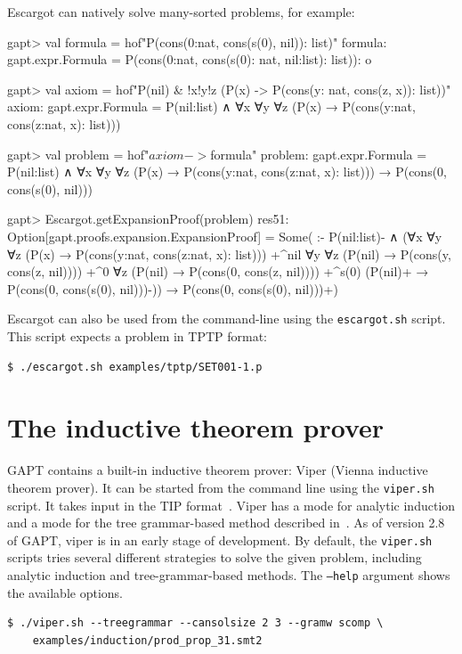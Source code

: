 \documentclass[a4paper,11pt]{book}
\newcommand{\cli}[1]{{\ttfamily {#1}}}
\begin{document}
Escargot can natively solve many-sorted problems, for example:
\begin{clilisting}
gapt> val formula = hof"P(cons(0:nat, cons(s(0), nil)): list)"
formula: gapt.expr.Formula = P(cons(0:nat, cons(s(0): nat, nil:list): list)): o

gapt> val axiom = hof"P(nil) & !x!y!z (P(x) -> P(cons(y: nat, cons(z, x)): list))"
axiom: gapt.expr.Formula = P(nil:list) ∧ ∀x ∀y ∀z (P(x) → P(cons(y:nat, cons(z:nat, x): list)))

gapt> val problem = hof"$axiom -> $formula"
problem: gapt.expr.Formula =
P(nil:list) ∧ ∀x ∀y ∀z (P(x) → P(cons(y:nat, cons(z:nat, x): list))) →
  P(cons(0, cons(s(0), nil)))

gapt> Escargot.getExpansionProof(problem)
res51: Option[gapt.proofs.expansion.ExpansionProof] =
Some(
:-
P(nil:list)- ∧
    (∀x ∀y ∀z (P(x) → P(cons(y:nat, cons(z:nat, x): list)))
      +^{nil}
        ∀y ∀z (P(nil) → P(cons(y, cons(z, nil))))
        +^{0}
          ∀z (P(nil) → P(cons(0, cons(z, nil))))
          +^{s(0)} (P(nil)+ → P(cons(0, cons(s(0), nil)))-)) →
  P(cons(0, cons(s(0), nil)))+)

\end{clilisting}


Escargot can also be used from the command-line using the \texttt{escargot.sh}
script.  This script expects a problem in TPTP format:
\begin{lstlisting}
$ ./escargot.sh examples/tptp/SET001-1.p
\end{lstlisting}

\section{The inductive theorem prover \cli{viper}}

GAPT contains a built-in inductive theorem prover: Viper (Vienna inductive theorem prover). It
can be started from the command line using the \texttt{viper.sh} script. It takes input in the
TIP format~\cite{Claessen15TIP}. Viper has a mode for analytic induction and a mode for 
the tree grammar-based method described in~\cite{Eberhard15Inductive}. As of version 2.8 of GAPT,
viper is in an early stage of development.  By default, the \texttt{viper.sh}
scripts tries several different strategies to solve the given problem,
including analytic induction and tree-grammar-based methods.  The
\texttt{--help} argument shows the available options.
\begin{lstlisting}
$ ./viper.sh --treegrammar --cansolsize 2 3 --gramw scomp \
    examples/induction/prod_prop_31.smt2
\end{lstlisting}
\end{document}
